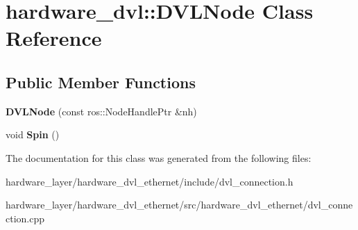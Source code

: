 \hypertarget{classhardware__dvl_1_1DVLNode}{}\section{hardware\+\_\+dvl\+:\+:D\+V\+L\+Node Class Reference}
\label{classhardware__dvl_1_1DVLNode}
\subsection*{Public Member Functions}
\begin{DoxyCompactItemize}
\item 
\mbox{\label{classhardware__dvl_1_1DVLNode_aa91c4da13e96fd56c72efba5c17bce21}} 
{\bfseries D\+V\+L\+Node} (const ros\+::\+Node\+Handle\+Ptr \&nh)
\item 
\mbox{\label{classhardware__dvl_1_1DVLNode_abf3be4e29c2226d6e37e3cbb25e11909}} 
void {\bfseries Spin} ()
\end{DoxyCompactItemize}


The documentation for this class was generated from the following files\+:\begin{DoxyCompactItemize}
\item 
hardware\+\_\+layer/hardware\+\_\+dvl\+\_\+ethernet/include/dvl\+\_\+connection.\+h\item 
hardware\+\_\+layer/hardware\+\_\+dvl\+\_\+ethernet/src/hardware\+\_\+dvl\+\_\+ethernet/dvl\+\_\+connection.\+cpp\end{DoxyCompactItemize}
